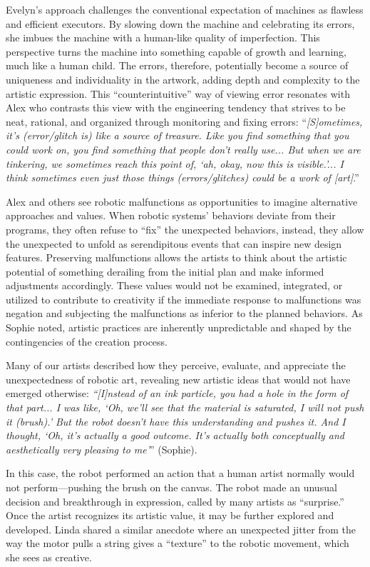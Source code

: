 Evelyn’s approach challenges the conventional expectation of machines as flawless and efficient executors. By slowing down the machine and celebrating its errors, she imbues the machine with a human-like quality of imperfection. This perspective turns the machine into something capable of growth and learning, much like a human child. The errors, therefore, potentially become a source of uniqueness and individuality in the artwork, adding depth and complexity to the artistic expression. This ``counterintuitive'' way of viewing error resonates with Alex who contrasts this view with the engineering tendency that strives to be neat, rational, and organized through monitoring and fixing errors: ``\textit{[S]ometimes, it's (error/glitch is) like a source of treasure. Like you find something that you could work on, you find something that people don't really use... But when we are tinkering, we sometimes reach this point of, `ah, okay, now this is visible.'... I think sometimes even just those things (errors/glitches) could be a work of [art]}.''

Alex and others see robotic malfunctions as opportunities to imagine alternative approaches and values. When robotic systems' behaviors deviate from their programs, they often refuse to ``fix'' the unexpected behaviors, instead, they allow the unexpected to unfold as serendipitous events that can inspire new design features. Preserving malfunctions allows the artists to think about the artistic potential of something derailing from the initial plan and make informed adjustments accordingly. These values would not be examined, integrated, or utilized to contribute to creativity if the immediate response to malfunctions was negation and subjecting the malfunctions as inferior to the planned behaviors. As Sophie noted, artistic practices are inherently unpredictable and shaped by the contingencies of the creation process.

Many of our artists described how they perceive, evaluate, and appreciate the unexpectedness of robotic art, revealing new artistic ideas that would not have emerged otherwise: \textit{``[I]nstead of an ink particle, you had a hole in the form of that part... I was like, `Oh, we'll see that the material is saturated, I will not push it (brush).' But the robot doesn't have this understanding and pushes it. And I thought, `Oh, it's actually a good outcome. It's actually both conceptually and aesthetically very pleasing to me'}'' (Sophie).

In this case, the robot performed an action that a human artist normally would not perform---pushing the brush on the canvas. The robot made an unusual decision and breakthrough in expression, called by many artists as ``surprise.'' Once the artist recognizes its artistic value, it may be further explored and developed. Linda shared a similar anecdote where an unexpected jitter from the way the motor pulls a string gives a ``texture'' to the robotic movement, which she sees as creative.

